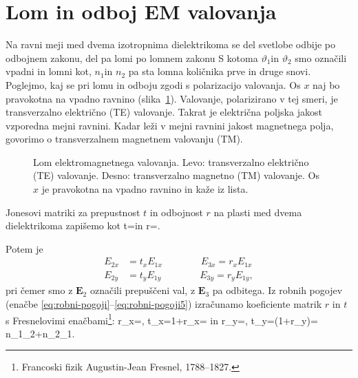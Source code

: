 \section{Lom in odboj EM valovanja}

Na ravni meji med dvema izotropnima dielektrikoma se del svetlobe
odbije po odbojnem zakonu, del pa lomi po lomnem zakonu
S kotoma $\vartheta_{1}$in $\vartheta_{2}$ smo označili vpadni in lomni
kot, $n_{1}$in $n_{2}$ pa sta lomna količnika prve in druge snovi.
Poglejmo, kaj se pri lomu in odboju zgodi s polarizacijo valovanja.
Os $x$ naj bo pravokotna na vpadno ravnino (slika~\ref{fig:Lom}). 
Valovanje, polarizirano v tej smeri, je transverzalno električno
(TE) valovanje. 
Takrat je električna poljska jakost vzporedna mejni ravnini. 
Kadar leži v mejni ravnini jakost magnetnega polja, govorimo o transverzalnem
magnetnem valovanju (TM).\\

\begin{figure}[h]
\centering {} 
  
\caption{Lom elektromagnetnega valovanja. Levo: transverzalno električno (TE) valovanje. 
Desno: transverzalno magnetno (TM) valovanje. Os $x$ je pravokotna na vpadno ravnino 
in kaže iz lista.}
\label{fig:Lom}
\end{figure}

Jonesovi matriki za prepustnost $t$ in odbojnost $r$ 
na plasti med dvema dielektrikoma zapišemo kot 
\beq
 t=\left[\begin{array}{cc}
t_{x} & 0\\
0 & t_{y}
\end{array}\right]
 \qquad \textrm{in} \qquad 
 r=\left[\begin{array}{cc}
r_{x} & 0\\
0 & r_{y}
\end{array}\right].
\eeq

Potem je 
\begin{align}
E_{2x} & =t_{x}E_{1x} \qquad \qquad E_{3x} =r_{x}E_{1x}\\
E_{2y} & =t_{y}E_{1y} \qquad \qquad E_{3y}=r_{y}E_{1y},
\end{align}
pri čemer smo z $\mathbf{E}_{2}$ označili prepuščeni val, z $\mathbf{E}_{3}$ pa odbitega.
Iz robnih pogojev (enačbe \ref{eq:robni-pogoji}--\ref{eq:robni-pogoji5}) 
izračunamo koeficiente matrik
$r$ in $t$ s Fresnelovimi 
enačbami\footnote{Francoski fizik Augustin-Jean Fresnel, 1788--1827.}:
\beq
r_{x}=,
\qquad t_{x}=1+r_{x}=
\eeq
in
\beq
r_{y}=,
\qquad t_{y}=(1+r_{y})=
{n_{1}\cos\vartheta_{2}+n_{2}\cos\vartheta_{1}}.
\eeq

